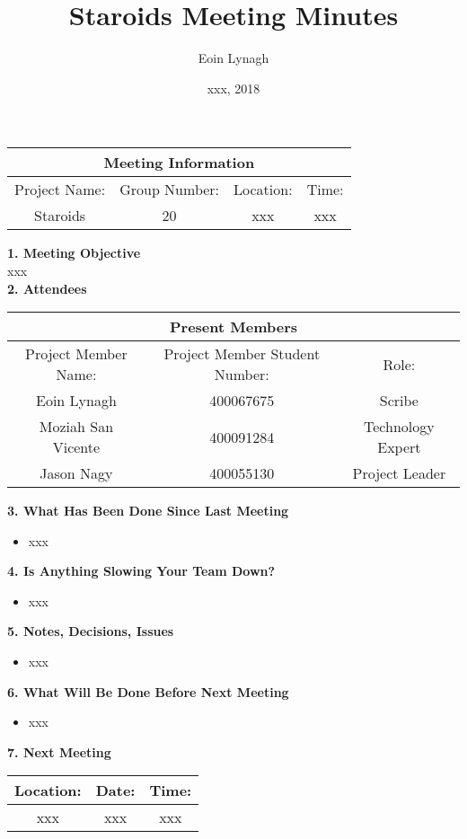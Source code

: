 \documentclass[12pt]{article}
\title{Staroids Meeting Minutes}
\author{Eoin Lynagh}
\date{xxx, 2018}
\begin{document}
\maketitle
\begin{center}
 \begin{tabular}{|c | c | c |  c |} 
 \hline
 \multicolumn{4}{|c|}{Meeting Information} \\
\hline
 Project Name: & Group Number: & Location: & Time: \\ 
 \hline
 Staroids & 20 & xxx & xxx \\
\hline
\end{tabular}
\end{center}
\begin{flushleft}


\textbf{1. Meeting Objective}\\
xxx\\

\textbf{2. Attendees}\\
\begin{center}
 \begin{tabular}{|c | c | c | } 
 \hline
 \multicolumn{3}{|c|}{Present Members} \\
\hline
 Project Member Name: & Project Member Student Number: & Role: \\ 
 \hline\hline
 Eoin Lynagh & 400067675 & Scribe \\
\hline
Moziah San Vicente & 400091284 & Technology Expert \\
\hline
 Jason Nagy & 400055130 & Project Leader \\
\hline
\end{tabular}
\end{center}

\textbf{3. What Has Been Done Since Last Meeting}\\
\begin{itemize}
\item xxx
\end{itemize}

\textbf{4. Is Anything Slowing Your Team Down?}\\
\begin{itemize}
\item xxx
\end{itemize}

\textbf{5. Notes, Decisions, Issues}\\
\begin{itemize}
\item xxx
\end{itemize}


\textbf{6. What Will Be Done Before Next Meeting}\\
\begin{itemize}
\item xxx\\
\end{itemize}

\textbf{7. Next Meeting}\\
\begin{center}
 \begin{tabular}{|c | c | c |} 
\hline
 Location: & Date: & Time: \\ 
 \hline
 xxx & xxx & xxx\\
\hline
\end{tabular}
\end{center}

\end{flushleft}
\end{document}
